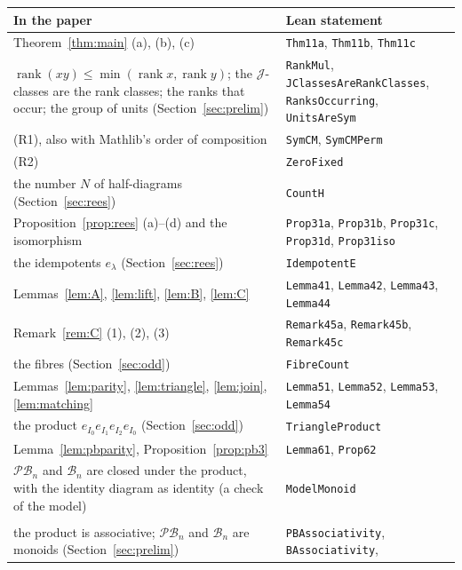\documentclass[11pt]{article}
\theoremstyle{remark}
\newcommand{\B}{\mathcal B}
\newcommand{\PB}{\mathcal{PB}}
\newcommand{\rk}{\operatorname{rank}}
\begin{document}
\begin{table}[ht]\centering\small
\begin{tabular}{@{}>{\raggedright\arraybackslash}p{}
 >{\raggedright\arraybackslash}p{}@{}}\toprule
In the paper & Lean statement\\\midrule
Theorem~\ref{thm:main} (a), (b), (c) & \texttt{Thm11a}, \texttt{Thm11b}, \texttt{Thm11c}\\
$\rk(xy)\le\min(\rk x,\rk y)$; the $\mathcal J$-classes are the rank classes;
 the ranks that occur; the group of units (Section~\ref{sec:prelim}) &
 \texttt{RankMul}, \texttt{JClassesAreRankClasses}, \texttt{RanksOccurring},
 \texttt{UnitsAreSym}\\
(R1), also with Mathlib's order of composition & \texttt{SymCM}, \texttt{SymCMPerm}\\
(R2) & \texttt{ZeroFixed}\\
the number $N$ of half-diagrams (Section~\ref{sec:rees}) & \texttt{CountH}\\
Proposition~\ref{prop:rees} (a)--(d) and the isomorphism & \texttt{Prop31a},
 \texttt{Prop31b}, \texttt{Prop31c}, \texttt{Prop31d}, \texttt{Prop31iso}\\
the idempotents $e_\lambda$ (Section~\ref{sec:rees}) & \texttt{IdempotentE}\\
Lemmas~\ref{lem:A}, \ref{lem:lift}, \ref{lem:B}, \ref{lem:C} & \texttt{Lemma41},
 \texttt{Lemma42}, \texttt{Lemma43}, \texttt{Lemma44}\\
Remark~\ref{rem:C} (1), (2), (3) & \texttt{Remark45a}, \texttt{Remark45b},
 \texttt{Remark45c}\\
the fibres (Section~\ref{sec:odd}) & \texttt{FibreCount}\\
Lemmas~\ref{lem:parity}, \ref{lem:triangle}, \ref{lem:join}, \ref{lem:matching}
 & \texttt{Lemma51}, \texttt{Lemma52}, \texttt{Lemma53}, \texttt{Lemma54}\\
the product $e_{I_0}e_{I_1}e_{I_2}e_{I_0}$ (Section~\ref{sec:odd}) &
 \texttt{TriangleProduct}\\
Lemma~\ref{lem:pbparity}, Proposition~\ref{prop:pb3} & \texttt{Lemma61},
 \texttt{Prop62}\\
$\PB_n$ and $\B_n$ are closed under the product, with the identity diagram as
 identity (a check of the model) & \texttt{ModelMonoid}\\\midrule
\multicolumn{2}{@{}l}{\emph{Supplementary statements}}\\
the product is associative; $\PB_n$ and $\B_n$ are monoids
 (Section~\ref{sec:prelim}) & \texttt{PBAssociativity}, \texttt{BAssociativity},

\end{tabular}
\end{table}
\end{document}
